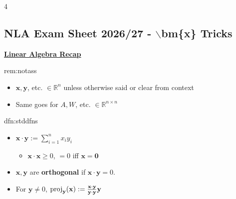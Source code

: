 \documentclass[landscape, 8pt]{extarticle}
\begin{document}
\begin{multicols*}{4}
	\raggedcolumns 
	\vspace{-5pt}
	\subsection*{NLA Exam Sheet 2026/27 - $\backslash$bm\{x\} Tricks}
	\vspace{-5pt}
	

{\footnotesize \textbf{\underline{Linear Algebra Recap}}}
		
		
		\begin{rem}{rem:notass}{ }
			\begin{itemize}
				\item $\mathbf{x}, \mathbf{y}$, etc. $\in \mathbb{R}^n$ unless otherwise said or clear from context
				\item Same goes for $A, W$, etc. $\in \mathbb{R}^{n \times n}$
			\end{itemize}
			
		\end{rem}
		
		
		\begin{dfn}{dfn:stddfns}{ }
			\begin{itemize}
				\item $\mathbf{x} \cdot \mathbf{y} := \sum_{i=1}^{n}x_i y_i$
					\begin{itemize}
						\item $\mathbf{x} \cdot  \mathbf{x} \ge 0$, $=0$ iff $\mathbf{x} = \mathbf{0}$
					\end{itemize}
				\item $\mathbf{x}, \mathbf{y}$ are \textbf{orthogonal} if $\mathbf{x} \cdot  \mathbf{y} = 0$.
				\item For $\mathbf{y} \ne 0$, $\operatorname{proj}_{\mathbf{y}} (\mathbf{x}) := \frac{\mathbf{x} \cdot  \mathbf{y}}{\mathbf{y}\cdot \mathbf{y}}\mathbf{y}$
			\end{itemize}
			
		\end{dfn}
		

\end{multicols*}
\end{document}
